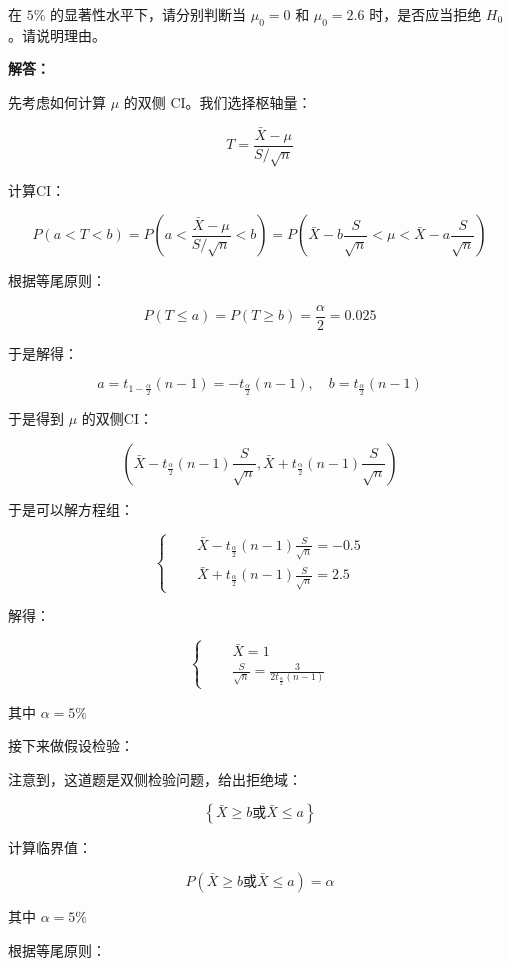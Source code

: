 \documentclass[12pt,a4paper]{article}
\begin{document}
在 $5\%$ 的显著性水平下，请分别判断当 $\mu_0=0$ 和 $\mu_0=2.6$ 时，是否应当拒绝 $H_0$。请说明理由。

\begin{answerbox}
\textbf{解答：}

先考虑如何计算 $\mu$ 的双侧 CI。我们选择枢轴量：

$$
T = \frac{\bar{X}-\mu}{S/\sqrt{n}}
$$

计算CI：

$$
P\left(a < T < b\right) = P\left(a < \frac{\bar{X}-\mu}{S/\sqrt{n}} < b\right) = P\left(\bar{X}-b\frac{S}{\sqrt{n}} < \mu < \bar{X}-a\frac{S}{\sqrt{n}}\right)
$$

根据等尾原则：

$$
P\left(T \leq a \right) = P\left(T \geq b \right) = \frac{\alpha}{2} = 0.025
$$

于是解得：

$$
a = t_{1-\frac{\alpha}{2}}(n-1) = -t_{\frac{\alpha}{2}}(n-1), \quad b = t_{\frac{\alpha}{2}}(n-1)
$$

于是得到 $\mu$ 的双侧CI：

$$
\left(\bar{X}-t_{\frac{\alpha}{2}}(n-1)\frac{S}{\sqrt{n}} , \bar{X}+t_{\frac{\alpha}{2}}(n-1)\frac{S}{\sqrt{n}}\right)
$$

于是可以解方程组：

$$
\left\{
\begin{aligned}
  \quad&\bar{X}-t_{\frac{\alpha}{2}}(n-1)\frac{S}{\sqrt{n}} = -0.5\\
  \quad&\bar{X}+t_{\frac{\alpha}{2}}(n-1)\frac{S}{\sqrt{n}} = 2.5
\end{aligned}
\right.
$$

解得：

$$
\left\{
\begin{aligned}
  \quad& \bar{X} = 1\\
  \quad& \frac{S}{\sqrt{n}} = \frac{3}{2t_{\frac{\alpha}{2}}(n-1)}
\end{aligned}
\right.
$$

其中 $\alpha = 5\%$

接下来做假设检验：

注意到，这道题是双侧检验问题，给出拒绝域：

$$
\left\{\bar{X} \geq b \text{或} \bar{X} \leq a\right\}
$$

计算临界值：

$$
P\left(\bar{X} \geq b \text{或} \bar{X} \leq a\right) = \alpha
$$

其中 $\alpha = 5\%$

根据等尾原则：


\end{answerbox}
\end{document}

